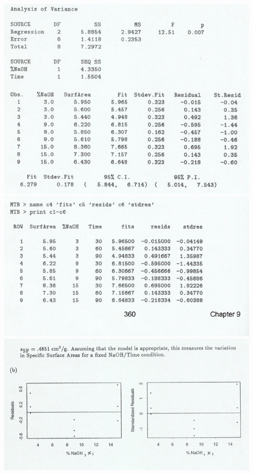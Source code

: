 \documentclass{article}\usepackage{graphicx, color}
\numberwithin{equation}{section}
\begin{document}
\begin{flushleft}
\begin{enumerate}[1. ]
 \includegraphics{../../fig/h11p4sol3.png}
 \includegraphics{../../fig/h11p4sol4.png}
 \includegraphics{../../fig/h11p4sol5.png}

\end{enumerate}
\end{flushleft}
\end{document}
